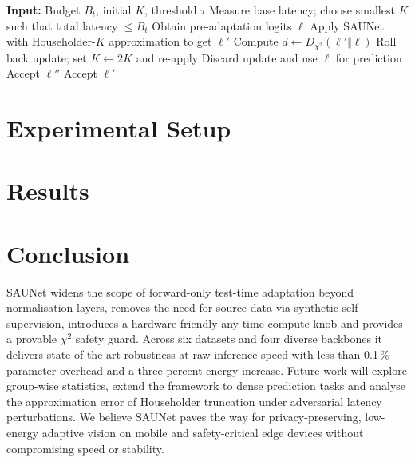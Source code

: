 \documentclass{article}
\begin{document}
\begin{algorithm}[t]
  \caption{Any-time inference with $\chi^2$ collapse guard}
  \begin{algorithmic}[1]
    \State \textbf{Input:} Budget $B_t$, initial $K$, threshold $\tau$
    \State Measure base latency; choose smallest $K$ such that total latency $\le B_t$
    \State Obtain pre-adaptation logits $\ell$
    \State Apply SAUNet with Householder-$K$ approximation to get $\ell'$
    \State Compute $d \leftarrow D_{\chi^2}(\ell'\Vert\ell)$
      \State Roll back update; set $K \leftarrow 2K$ and re-apply
        \State Discard update and use $\ell$ for prediction
      \Else
        \State Accept $\ell''$
      \EndIf
    \Else
      \State Accept $\ell'$
    \EndIf
  \end{algorithmic}
\end{algorithm}

\section{Experimental Setup}

\section{Results}

\section{Conclusion}
SAUNet widens the scope of forward-only test-time adaptation beyond normalisation layers, removes the need for source data via synthetic self-supervision, introduces a hardware-friendly any-time compute knob and provides a provable \(\chi^2\) safety guard. Across six datasets and four diverse backbones it delivers state-of-the-art robustness at raw-inference speed with less than 0.1\,\% parameter overhead and a three-percent energy increase. Future work will explore group-wise statistics, extend the framework to dense prediction tasks and analyse the approximation error of Householder truncation under adversarial latency perturbations. We believe SAUNet paves the way for privacy-preserving, low-energy adaptive vision on mobile and safety-critical edge devices without compromising speed or stability.
\end{document}
